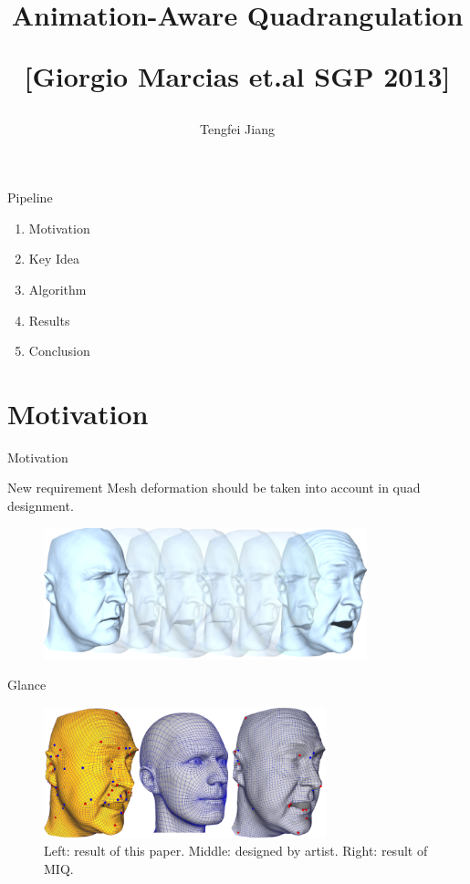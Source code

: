 \documentclass{beamer}
\begin{document}
\title{Animation-Aware Quadrangulation
 
[\small{Giorgio Marcias et.al SGP 2013}]}
\author{Tengfei Jiang}

\newcommand{\FPP}[2]{\frac{\partial #1}{\partial #2}}
\begin{frame}
  \titlepage
\end{frame}

\begin{frame}{Pipeline}
  \begin{enumerate}
    \item Motivation 
    \item Key Idea
    \item Algorithm
    \item Results
    \item Conclusion
  \end{enumerate}
\end{frame}

\section{Motivation}
\begin{frame}{Motivation}
\begin{block}{New requirement}
Mesh deformation should be taken into account in quad designment.
\end{block}
\begin{figure}[!htb]
\centering
\includegraphics[height=1.5in]{./img/face-seq.png}
\end{figure}
\end{frame}

\begin{frame}{Glance}
\begin{figure}[!htb]
\centering
\includegraphics[height=1.5in]{./img/face-quad.png}
\caption{Left: result of this paper. Middle: designed by artist. Right: result of MIQ.}
\end{figure}
\end{frame}
\end{document}
